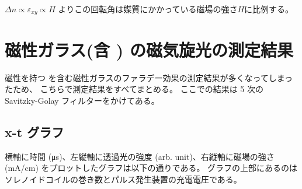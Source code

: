 \documentclass[9pt,dvipdfmx,a4paper]{jsarticle}
\begin{document}
\(\Delta n \propto \varepsilon_{xy} \propto H\) よりこの回転角は媒質にかかっている磁場の強さ\(H\)に比例する。

\section{磁性ガラス(含 ) の磁気旋光の測定結果}
磁性を持つ  を含む磁性ガラスのファラデー効果の測定結果が多くなってしまったため、
こちらで測定結果をすべてまとめる。
ここでの結果は 5 次の Savitzky-Golay  フィルターをかけてある。

\subsection{x-t グラフ}
横軸に時間 (\si{\micro s})、左縦軸に透過光の強度 (arb. unit)、右縦軸に磁場の強さ (mA/cm) をプロットしたグラフは以下の通りである。
グラフの上部にあるのはソレノイドコイルの巻き数とパルス発生装置の充電電圧である。
\end{document}
